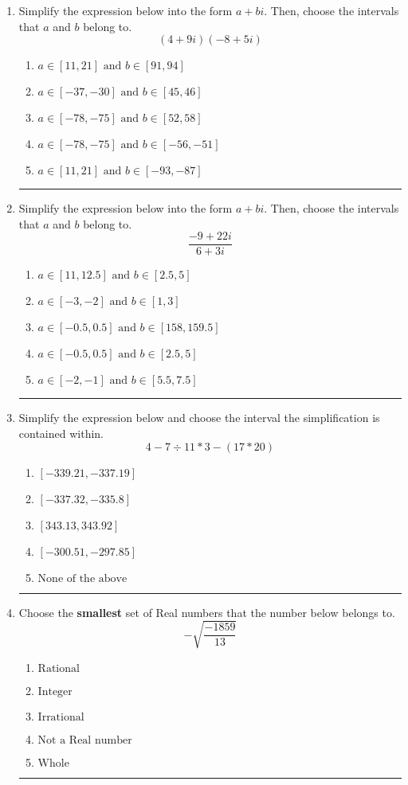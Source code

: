 \documentclass[14pt]{extbook}
\newcommand{\litem}[1]{\item#1\hspace*{-1cm}\rule{\textwidth}{0.4pt}}
\begin{document}
\begin{enumerate}
{\begin{enumerate}[label=\Alph*.]
\end{enumerate} }
\litem{
Simplify the expression below into the form $a+bi$. Then, choose the intervals that $a$ and $b$ belong to.\[ (4 + 9 i)(-8 + 5 i) \]\begin{enumerate}[label=\Alph*.]
\item \( a \in [11, 21] \text{ and } b \in [91, 94] \)
\item \( a \in [-37, -30] \text{ and } b \in [45, 46] \)
\item \( a \in [-78, -75] \text{ and } b \in [52, 58] \)
\item \( a \in [-78, -75] \text{ and } b \in [-56, -51] \)
\item \( a \in [11, 21] \text{ and } b \in [-93, -87] \)

\end{enumerate} }
\litem{
Simplify the expression below into the form $a+bi$. Then, choose the intervals that $a$ and $b$ belong to.\[ \frac{-9 + 22 i}{6 + 3 i} \]\begin{enumerate}[label=\Alph*.]
\item \( a \in [11, 12.5] \text{ and } b \in [2.5, 5] \)
\item \( a \in [-3, -2] \text{ and } b \in [1, 3] \)
\item \( a \in [-0.5, 0.5] \text{ and } b \in [158, 159.5] \)
\item \( a \in [-0.5, 0.5] \text{ and } b \in [2.5, 5] \)
\item \( a \in [-2, -1] \text{ and } b \in [5.5, 7.5] \)

\end{enumerate} }
\litem{
Simplify the expression below and choose the interval the simplification is contained within.\[ 4 - 7 \div 11 * 3 - (17 * 20) \]\begin{enumerate}[label=\Alph*.]
\item \( [-339.21, -337.19] \)
\item \( [-337.32, -335.8] \)
\item \( [343.13, 343.92] \)
\item \( [-300.51, -297.85] \)
\item \( \text{None of the above} \)

\end{enumerate} }
\litem{
Choose the \textbf{smallest} set of Real numbers that the number below belongs to.\[ -\sqrt{\frac{-1859}{13}} \]\begin{enumerate}[label=\Alph*.]
\item \( \text{Rational} \)
\item \( \text{Integer} \)
\item \( \text{Irrational} \)
\item \( \text{Not a Real number} \)
\item \( \text{Whole} \)


\end{enumerate}}
\end{enumerate}
\end{document}
